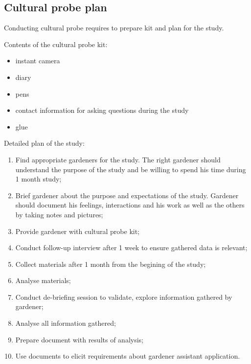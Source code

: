 \documentclass[12pt, a4paper]{article}
\begin{document}
\subsection{Cultural probe plan}
Conducting cultural probe requires to prepare kit and plan for the study.

Contents of the cultural probe kit:
\begin{itemize}
\item instant camera
\item diary
\item pens
\item contact information for asking questions during the study
\item glue
\end{itemize}

Detailed plan of the study:
\begin{enumerate}
\item Find appropriate gardeners for the study. The right gardener should understand the purpose of the study and be willing to spend his time during 1 month study;
\item Brief gardener about the purpose and expectations of the study. Gardener should document his feelings, interactions and his work as well as the others by taking notes and pictures;
\item Provide gardener with cultural probe kit;
\item Conduct follow-up interview after 1 week to ensure gathered data is relevant;
\item Collect materials after 1 month from the begining of the study;
\item Analyse materials;
\item Conduct de-briefing session to validate, explore information gathered by gardener;
\item Analyse all information gathered;
\item Prepare document with results of analysis;
\item Use documents to elicit requirements about gardener assistant application.
\end{enumerate}
\end{document}
